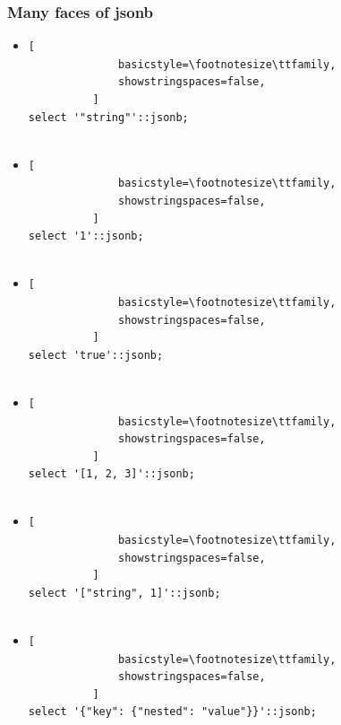 \documentclass[14pt, compress, aspectratio=169]{beamer}
\begin{document}
\begin{frame}[fragile]
    \frametitle{Many faces of jsonb}

  \begin{itemize}
      \item<+->
          \begin{lstlisting}[
              basicstyle=\footnotesize\ttfamily,
              showstringspaces=false,
          ]
select '"string"'::jsonb;
         
          \end{lstlisting}

      \item<+->
          \begin{lstlisting}[
              basicstyle=\footnotesize\ttfamily,
              showstringspaces=false,
          ]
select '1'::jsonb;
         
          \end{lstlisting}

      \item<+->
          \begin{lstlisting}[
              basicstyle=\footnotesize\ttfamily,
              showstringspaces=false,
          ]
select 'true'::jsonb;
         
          \end{lstlisting}

      \item<+->
          \begin{lstlisting}[
              basicstyle=\footnotesize\ttfamily,
              showstringspaces=false,
          ]
select '[1, 2, 3]'::jsonb;
         
          \end{lstlisting}

      \item<+->
          \begin{lstlisting}[
              basicstyle=\footnotesize\ttfamily,
              showstringspaces=false,
          ]
select '["string", 1]'::jsonb;
         
          \end{lstlisting}

      \item<+->
          \begin{lstlisting}[
              basicstyle=\footnotesize\ttfamily,
              showstringspaces=false,
          ]
select '{"key": {"nested": "value"}}'::jsonb;
         
          \end{lstlisting}

  \end{itemize}

\end{frame}
\end{document}
